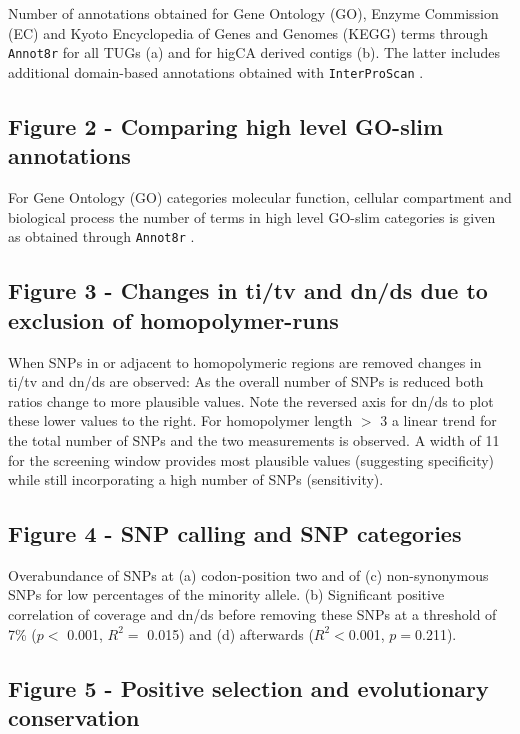 \documentclass[10pt]{bmc_article}
\newenvironment{bmcformat}{\begin{raggedright}\baselineskip20pt\sloppy\setboolean{publ}{false}}{\end{raggedright}\baselineskip20pt\sloppy}
\begin{document}
\begin{bmcformat}
Number of annotations obtained for Gene Ontology (GO), Enzyme
Commission (EC) and Kyoto Encyclopedia of Genes and Genomes (KEGG)
terms through \texttt{Annot8r} \cite{schmid_annot8r:_2008} for all
TUGs (a) and for higCA derived contigs (b). The latter includes
additional domain-based annotations obtained with
\texttt{InterProScan} \cite{pmid11590104}.

\subsection*{Figure 2 - Comparing high level GO-slim annotations}

For Gene Ontology (GO) categories molecular function, cellular
compartment and biological process the number of terms in high level
GO-slim categories is given as obtained through \texttt{Annot8r}
\cite{schmid_annot8r:_2008}.

\subsection*{Figure 3 - Changes in ti/tv and dn/ds due to exclusion of
  homopolymer-runs}

When SNPs in or adjacent to homopolymeric regions are removed changes
in ti/tv and dn/ds are observed: As the overall number of SNPs is
reduced both ratios change to more plausible values. Note the reversed
axis for dn/ds to plot these lower values to the right. For
homopolymer length $>$ 3 a linear trend for the total number of SNPs
and the two measurements is observed. A width of 11 for the screening
window provides most plausible values (suggesting specificity) while
still incorporating a high number of SNPs (sensitivity).

\subsection*{Figure 4 - SNP calling and SNP categories}
 
Overabundance of SNPs at (a) codon-position two and of (c)
non-synonymous SNPs for low percentages of the minority allele. (b)
Significant positive correlation of coverage and dn/ds before removing
these SNPs at a threshold of 7\% ($p<$ 0.001, $R^2=$
0.015) and (d) afterwards
($R^2<$0.001,
$p=$0.211).


\subsection*{Figure 5 - Positive selection and evolutionary
  conservation}


\end{bmcformat}
\end{document}

